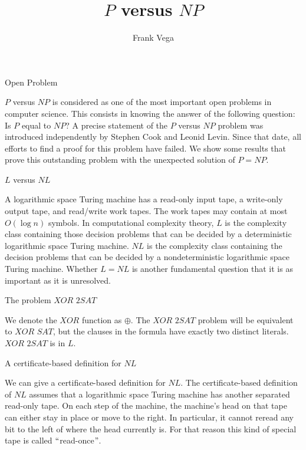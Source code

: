 \documentclass[11pt]{beamer}
\begin{document}
\title{$P$ versus $NP$}


\author{Frank Vega}



\maketitle

\begin{frame}{Open Problem}

$P$ versus $NP$ is considered as one of the most important open problems in computer science. This consists in knowing the answer of the following question: Is $P$ equal to $NP$? A precise statement of the $P$ versus $NP$ problem was introduced independently by Stephen Cook and Leonid Levin. Since that date, all efforts to find a proof for this problem have failed. We show some results that prove this outstanding problem with the unexpected solution of $P = NP$.

\end{frame}


\begin{frame}{$L$ versus $NL$}

A logarithmic space Turing machine has a read-only input tape, a write-only output tape, and read/write work tapes. The work tapes may contain at most $O(\log n)$ symbols. In computational complexity theory, $L$ is the complexity class containing those decision problems that can be decided by a deterministic logarithmic space Turing machine. $NL$ is the complexity class containing the decision problems that can be decided by a nondeterministic logarithmic space Turing machine. Whether $L = NL$ is another fundamental question that it is as important as it is unresolved.

\end{frame}

\begin{frame}{The problem $\textit{XOR 2SAT}$}

We denote the $XOR$ function as $\oplus$. The $\textit{XOR 2SAT}$ problem will be equivalent to $\textit{XOR SAT}$, but the clauses in the formula have exactly two distinct literals. $\textit{XOR 2SAT}$ is in $L$.

\end{frame}

\begin{frame}{A certificate-based definition for $NL$}

We can give a certificate-based definition for $NL$. The certificate-based definition of $NL$ assumes that a logarithmic space Turing machine has another separated read-only tape. On each step of the machine, the machine's head on that tape can either stay in place or move to the right. In particular, it cannot reread any bit to the left of where the head currently is. For that reason this kind of special tape is called $``$read-once$"$.

\end{frame}
\end{document}

